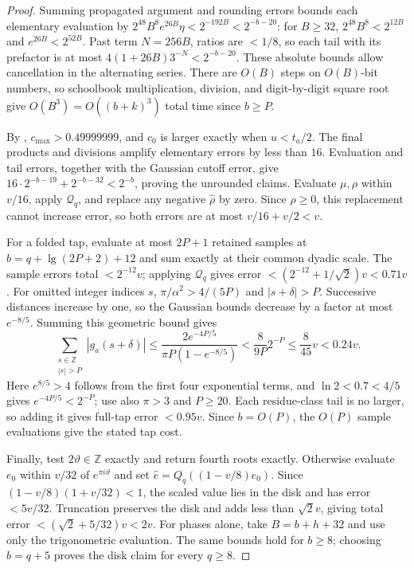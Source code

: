 \documentclass[11pt]{article}
\theoremstyle{definition}
\newcommand{\Z}{\mathbb{Z}}
\newcommand{\Quant}{\mathcal{Q}}
\newcommand{\abs}[1]{\left\lvert #1 \right\rvert}
\begin{document}
\begin{proof}
Summing propagated argument and rounding errors bounds each elementary
evaluation by $2^{48}B^8e^{26B}\eta<2^{-192B}<2^{-b-20}$:
for $B\ge32$, $2^{48}B^8<2^{12B}$ and $e^{26B}<2^{52B}$.
Past term $N=256B$, ratios are $<1/8$, so each tail with its prefactor is
at most $4(1+26B)3^{-N}<2^{-b-20}$.
These absolute bounds allow cancellation in the alternating series.
There are $O(B)$ steps on $O(B)$-bit numbers, so schoolbook multiplication,
division, and digit-by-digit square root give $O(B^3)=O((b+k)^3)$ total time
since $b\ge P$.

By , $c_{\max}>0.49999999$, and $c_0$ is larger
exactly when $u<t_a/2$.
The final products and divisions amplify elementary errors by less than $16$.
Evaluation and tail errors, together with the Gaussian cutoff error, give
$16\cdot2^{-b-19}+2^{-b-32}<2^{-b}$, proving the unrounded claims.
Evaluate $\mu,\rho$ within $v/16$, apply $\Quant_q$, and replace any negative
$\hat\rho$ by zero.
Since $\rho\ge0$, this replacement cannot increase error, so both errors
are at most $v/16+v/2<v$.

For a folded tap, evaluate at most $2P+1$ retained samples at
$b=q+\lg(2P+2)+12$ and sum exactly at their common dyadic scale.
The sample errors total $<2^{-12}v$; applying $\Quant_q$ gives error
$<(2^{-12}+1/\sqrt2)v<0.71v$.
For omitted integer indices $s$, $\pi/\alpha^2>4/(5P)$ and
$\abs{s+\delta}>P$.
Successive distances increase by one, so the Gaussian bounds decrease by
a factor at most $e^{-8/5}$.
Summing this geometric bound gives
\[
 \sum_{\substack{s\in\Z\\ \abs{s}>P}}\abs{g_a(s+\delta)}
 \le\frac{2e^{-4P/5}}{\pi P(1-e^{-8/5})}
 <\frac8{9P}2^{-P}\le\frac8{45}v<0.24v.
\]
Here $e^{8/5}>4$ follows from the first four exponential terms, and
$\ln2<0.7<4/5$ gives $e^{-4P/5}<2^{-P}$; use also $\pi>3$ and $P\ge20$.
Each residue-class tail is no larger, so adding it gives full-tap error
$<0.95v$.
Since $b=O(P)$, the $O(P)$ sample evaluations give the stated tap cost.

Finally, test $2\vartheta\in\Z$ exactly and return fourth roots exactly.
Otherwise evaluate $e_0$ within $v/32$ of $e^{\pi i\vartheta}$ and set
$\hat e=Q_q((1-v/8)e_0)$.
Since $(1-v/8)(1+v/32)<1$, the scaled value lies in the disk and has
error $<5v/32$.
Truncation preserves the disk and adds less than $\sqrt2v$, giving total
error $<(\sqrt2+5/32)v<2v$.
For phases alone, take $B=b+h+32$ and use only the trigonometric evaluation.
The same bounds hold for $b\ge8$; choosing $b=q+5$ proves the disk claim
for every $q\ge8$.
\end{proof}
\end{document}
